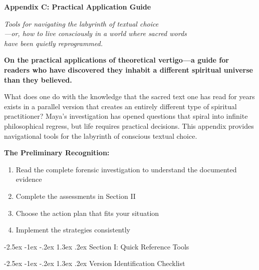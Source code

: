 \documentclass[12pt,twoside]{book}
\makeatletter
\renewcommand\section{\@startsection{section}{1}{\z@}%
{-2.5ex \@plus -1ex \@minus -.2ex}%
{1.3ex \@plus.2ex}%
{\normalfont\Large\bfseries}}
\makeatother
\begin{document}
\clearpage
\thispagestyle{empty}
\mbox{}
\newpage
\pagestyle{sectionopening}
\thispagestyle{sectionopening}
\markboth{}{}
\markright{}
\vspace*{0.25\textheight}
\begin{center}
{\Huge\bfseries Appendix C: Practical Application Guide}
\end{center}
\newpage

{\centering\itshape Tools for navigating the labyrinth of textual choice\\—or, how to live consciously in a world where sacred words\\have been quietly reprogrammed.\par}
\vspace{0.3cm}

\normalfont\justifying
\textbf{On the practical applications of theoretical vertigo—a guide for readers who have discovered they inhabit a different spiritual universe than they believed.}

What does one do with the knowledge that the sacred text one has read for years exists in a parallel version that creates an entirely different type of spiritual practitioner? Maya's investigation has opened questions that spiral into infinite philosophical regress, but life requires practical decisions. This appendix provides navigational tools for the labyrinth of conscious textual choice.

\textbf{\textbf{The Preliminary Recognition:}}
\begin{enumerate}
\item Read the complete forensic investigation to understand the documented evidence
\item Complete the assessments in Section II
\item Choose the action plan that fits your situation
\item Implement the strategies consistently
\end{enumerate}
\section{Section I: Quick Reference Tools}
\label{sec:org477da4d}

\section{Version Identification Checklist}
\label{sec:org2382f1b}
\end{document}
